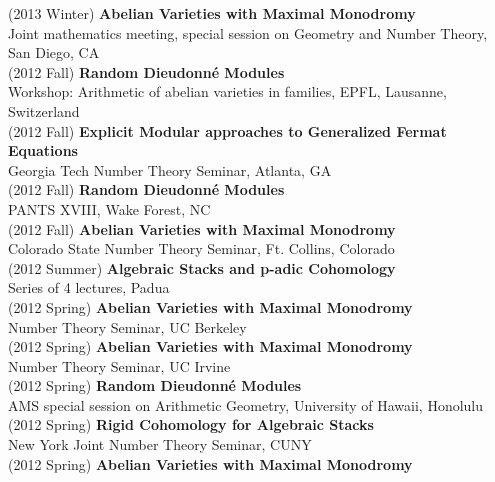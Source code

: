 \documentclass[margin,line]{res}
\begin{document}
\begin{resume}
(2013 Winter) \textbf{Abelian Varieties with Maximal Monodromy}\\
Joint mathematics meeting, special session on Geometry and Number Theory, San Diego, CA
\vspace{.05cm}\\
(2012 Fall) \textbf{Random Dieudonn\'e Modules}\\
Workshop: Arithmetic of abelian varieties in families, EPFL, Lausanne, Switzerland 
\vspace{.05cm}\\
(2012 Fall) \textbf{Explicit Modular approaches to Generalized Fermat Equations}\\
Georgia Tech Number Theory Seminar, Atlanta, GA 
\vspace{.05cm}\\
(2012 Fall) \textbf{Random Dieudonn\'e Modules}\\
PANTS XVIII, Wake Forest, NC 
\vspace{.05cm}\\
(2012 Fall) \textbf{Abelian Varieties with Maximal Monodromy}\\
Colorado State Number Theory Seminar, Ft. Collins, Colorado 
\vspace{.05cm}\\
(2012 Summer) \textbf{Algebraic Stacks and p-adic Cohomology}\\
Series of 4 lectures, Padua
\vspace{.05cm}\\
(2012 Spring) \textbf{Abelian Varieties with Maximal Monodromy}\\
Number Theory Seminar, UC Berkeley
\vspace{.05cm}\\
(2012 Spring) \textbf{Abelian Varieties with Maximal Monodromy}\\
Number Theory Seminar, UC Irvine
\vspace{.05cm}\\
(2012 Spring) \textbf{Random Dieudonn\'e Modules}\\
AMS special session on Arithmetic Geometry, University of Hawaii, Honolulu 
\vspace{.05cm}\\
(2012 Spring) \textbf{Rigid Cohomology for Algebraic Stacks}\\
New York Joint Number Theory Seminar, CUNY
\vspace{.05cm}\\
(2012 Spring) \textbf{Abelian Varieties with Maximal Monodromy}\\

\end{resume}
\end{document}
